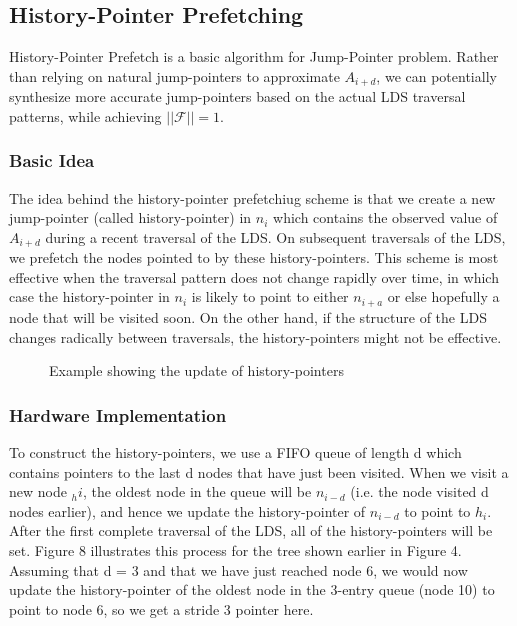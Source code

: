 \documentclass{acm_proc_article-sp}
\begin{document}
\subsection{History-Pointer Prefetching}
History-Pointer Prefetch is a basic algorithm for Jump-Pointer
problem.\cite{Luk:1996:CPR:248208.237190} 
Rather than relying on natural jump-pointers to approximate
$A_{i+d}$, we can potentially synthesize more accurate jump-pointers
based on the actual LDS traversal patterns, while achieving
$||\mathcal{F}|| = 1$.

\subsubsection{Basic Idea}
The idea behind the history-pointer prefetchiug scheme
is that we create a new jump-pointer (called  history-pointer)
in $n_i$ which contains the observed value of $A_{i+d}$ during a recent
traversal of the LDS. On subsequent traversals of the LDS, we prefetch the
nodes pointed to by these history-pointers. This scheme is most
effective when the traversal pattern does not change rapidly over
time, in which case the history-pointer in $n_i$ is likely to point
to either $n_{i+a}$ or else hopefully a node that will be visited soon.
On the other hand, if the structure of the LDS changes radically
between traversals, the history-pointers might not be effective.

\begin{figure}
\centering
{}
\caption{Example showing the update of history-pointers}
\end{figure}
\subsubsection{Hardware Implementation}
To construct the history-pointers, we use  a FIFO queue
of length d which contains pointers to the last d nodes that have
just been visited. When we visit a new node $_hi$, the oldest node in
the queue will be $n_{i-d}$ (i.e. the node visited d nodes earlier), and
hence we update the history-pointer of $n_{i-d}$ to point to $h_i$. After
the first complete traversal of the LDS, all of the history-pointers
will be set. Figure 8 illustrates this process for the tree shown
earlier in Figure 4. Assuming that 
d = 3 and that we have just reached node 6, we would now update
the history-pointer of the oldest node in the 3-entry queue (node
10) to point to node 6, so we get a stride 3 pointer here.
\end{document}
